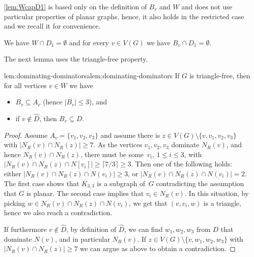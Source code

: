 \cref{lem:WcapD1} is based only on the definition of $B_v$ and $W$ and
does not use particular properties of planar graphs, hence, it also holds
in the restricted case and we recall it for convenience.


\setcounter{lemma}{7-1}
\begin{lemma}\label{alem:WcapD1}
  We have $W\cap D_1=\emptyset$ and for every $v\in V(G)$ we have
  $B_v\cap D_1=\emptyset$.
\end{lemma}

The next lemma uses the triangle-free property.

%
\begin{adapted}{lem:dominating-dominators}{alem:dominating-dominators}
  If $G$ is triangle-free, then for all vertices $v\in W$ we have

  \vspace{-5pt}
  \begin{itemize}
  \item $B_v \subseteq A_v$ (hence $|B_v|\le 3$), and \smallskip
  \item if $v\not\in \hat{D}$, then $B_v\subseteq D$.
  \end{itemize}
\end{adapted}
\begin{proof}
  Assume $A_v=\{v_1,v_2, v_3\}$ and assume there is $z\in V(G)\setminus \{v,v_1,v_2, v_3\}$
  with $|N_R(v) \cap N_R(z)| \geq 7$.
  As the vertices $v_1, v_2, v_3$ dominate $N_R(v)$, and hence $N_R(v)\cap N_R(z)$,
  there must be some~$v_i$, $1\leq i\leq 3$, with
  \mbox{$|N_R(v) \cap N_R(z) \cap N[v_i]| \geq \lceil 7/3\rceil \geq 3$}.
  Then one of the following holds: either
  \mbox{$|N_R(v) \cap N_R(z) \cap N(v_i)| \geq 3$},  or
  \mbox{$|N_R(v) \cap N_R(z) \cap N(v_i)| =2$}.
  The first case shows that $K_{3,3}$ is a subgraph of~$G$
  contradicting the assumption that $G$ is planar.
  The second case implies that $v_i\in N_R(v)$. In this situation, by picking
  $w \in N_R(v) \cap N_R(z) \cap N(v_i)$, we get that $(v,v_i,w)$ is a triangle,
  hence we also reach a contradiction.

  If furthermore $v\not\in \hat{D}$, by definition of $\hat{D}$,
  we can find $w_1,w_2, w_3$ from $D$
  that dominate $N(v)$, and in particular $N_R(v)$.
  If $z\in V(G)\setminus \{v,w_1,w_2, w_3\}$
  with $|N_R(v) \cap N_R(z)| \geq 7$ we can argue as above to obtain
  a contradiction.
\end{proof}


